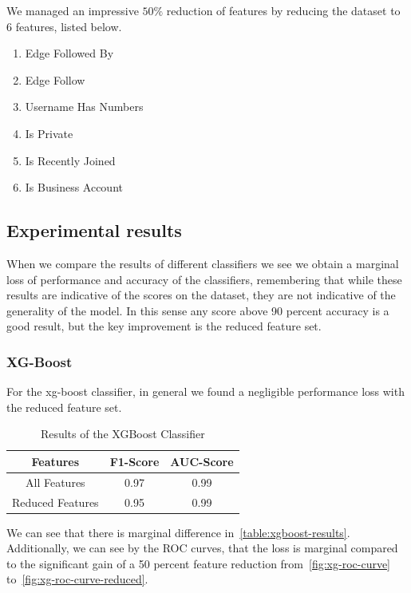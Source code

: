 \documentclass[conference]{IEEEtran}
\begin{document}
We managed an impressive $50\%$ reduction of features by reducing the dataset to 6 features, listed below.

\begin{enumerate}
	\item Edge Followed By
	\item Edge Follow
	\item Username Has Numbers
	\item Is Private
	\item Is Recently Joined
	\item Is Business Account
\end{enumerate}

\subsection{Experimental results}

When we compare the results of different classifiers we see we obtain a marginal loss of performance and accuracy of the classifiers, remembering that while these results are indicative of the scores on the dataset, they are not indicative of the generality of the model. In this sense any score above 90 percent accuracy is a good result, but the key improvement is the reduced feature set.

\subsubsection{XG-Boost}

For the xg-boost classifier, in general we found a negligible performance loss with the reduced feature set.

\begin{table}[h!]
	\begin{center}
		\begin{tabular}{| c | c c |}
			\hline
			Features         & F1-Score & AUC-Score \\ [0.5ex]
			\hline
			All Features     & 0.97     & 0.99      \\
			Reduced Features & 0.95     & 0.99      \\[1ex]
			\hline
		\end{tabular}
	\end{center}
	\caption{Results of the XGBoost Classifier}
	\label{table:xgboost-results}
\end{table}

We can see that there is marginal difference in~\autoref{table:xgboost-results}. Additionally, we can see by the ROC curves, that the loss is marginal compared to the significant gain of a 50 percent feature reduction from~\autoref{fig:xg-roc-curve} to~\autoref{fig:xg-roc-curve-reduced}.
\end{document}
